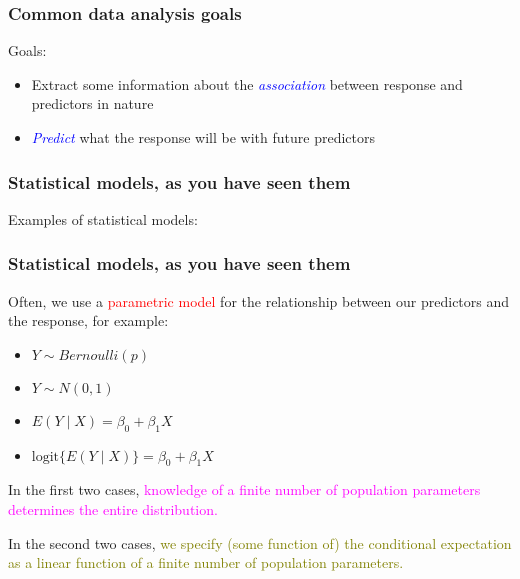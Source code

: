 \documentclass[12pt, 
hyperref={colorlinks=true, linkcolor=blue, urlcolor=cyan}]{beamer}
\begin{document}
\begin{frame}
\frametitle{Common data analysis goals}
\begin{center}
\end{center}

Goals: \vspace{-0.3cm}
\begin{itemize}
\item Extract some information about the \textcolor{blue}{\textit{association}} between response and predictors in nature
\item \textcolor{blue}{\textit{Predict}} what the response will be with future predictors
\end{itemize} 
\end{frame}

\begin{frame}
\frametitle{Statistical models, as you have seen them}
Examples of statistical models: \vspace{6cm}
\end{frame}

\begin{frame}
\frametitle{Statistical models, as you have seen them}
Often, we use a \textcolor{red}{parametric model} for the relationship between our predictors and the response, for example: \vspace{-0.3cm}
\begin{itemize}
\item $Y \sim Bernoulli(p)$ 
\item $Y \sim N(0, 1)$
\item $E(Y \mid X) = \beta_0 + \beta_1 X$ 
\item $\text{logit} \{E(Y \mid X)\} = \beta_0 + \beta_1 X$
\end{itemize}

In the first two cases, \textcolor{magenta}{knowledge of a finite number of population parameters determines the entire distribution.}

In the second two cases, \textcolor{olive}{we specify (some function of) the conditional expectation as a linear function of a finite number of population parameters.}
\end{frame}
\end{document}
